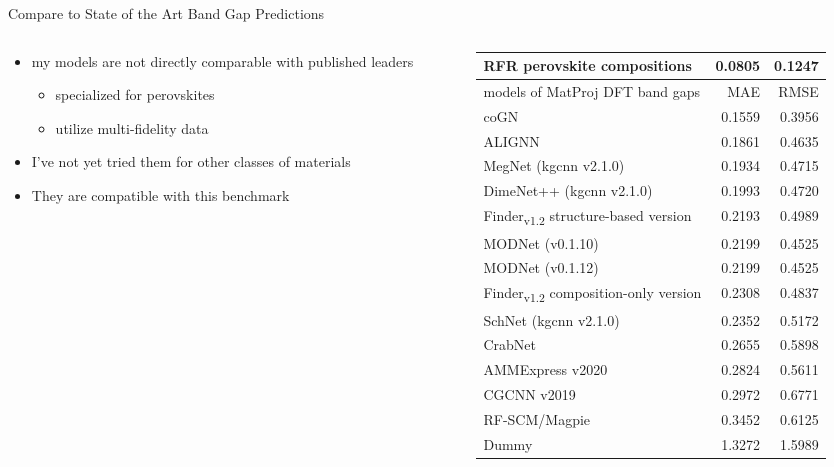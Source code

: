 \documentclass[10pt, aspectratio=169, presentation]{beamer}
\begin{document}
\begin{frame}[label={sec:org250affb}]{Compare to State of the Art Band Gap Predictions}
\begin{columns}
\begin{column}{0.4\columnwidth}
\begin{itemize}
\item my models are not directly comparable with published leaders
\begin{itemize}
\item specialized for perovskites
\item utilize multi-fidelity data
\end{itemize}
\item I've not yet tried them for other classes of materials
\item They \alert{are} compatible with this benchmark
\end{itemize}
\end{column}

\begin{column}{0.6\columnwidth}
\scriptsize
\begin{center}
\begin{tabular}{lrr}
RFR perovskite compositions & 0.0805 & 0.1247\\[0pt]
\hline
models of MatProj DFT band gaps & MAE & RMSE\\[0pt]
\hline
coGN & 0.1559 & 0.3956\\[0pt]
ALIGNN & 0.1861 & 0.4635\\[0pt]
MegNet (kgcnn v2.1.0) & 0.1934 & 0.4715\\[0pt]
DimeNet++ (kgcnn v2.1.0) & 0.1993 & 0.4720\\[0pt]
Finder\textsubscript{v1.2} structure-based version & 0.2193 & 0.4989\\[0pt]
MODNet (v0.1.10) & 0.2199 & 0.4525\\[0pt]
MODNet (v0.1.12) & 0.2199 & 0.4525\\[0pt]
Finder\textsubscript{v1.2} composition-only version & 0.2308 & 0.4837\\[0pt]
SchNet (kgcnn v2.1.0) & 0.2352 & 0.5172\\[0pt]
CrabNet & 0.2655 & 0.5898\\[0pt]
AMMExpress v2020 & 0.2824 & 0.5611\\[0pt]
CGCNN v2019 & 0.2972 & 0.6771\\[0pt]
RF-SCM/Magpie & 0.3452 & 0.6125\\[0pt]
Dummy & 1.3272 & 1.5989\\[0pt]
\end{tabular}
\end{center}
\end{column}
\end{columns}
\end{frame}
\end{document}
